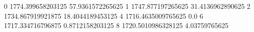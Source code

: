 0 1774.399658203125 57.9361572265625
1 1747.877197265625 31.4136962890625
2 1734.867919921875 18.4044189453125
4 1716.4635009765625 0.0
6 1717.334716796875 0.8712158203125
8 1720.5010986328125 4.03759765625
